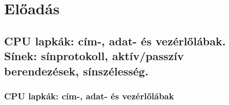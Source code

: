 \documentclass[10pt]{article}
\begin{document}
\section{Előadás}

\subsection{CPU lapkák: cím-, adat- és vezérlőlábak. Sínek: sínprotokoll, aktív/passzív berendezések, sínszélesség.}

\subsubsection{CPU lapkák: cím-, adat- és vezérlőlábak}


\end{document}
